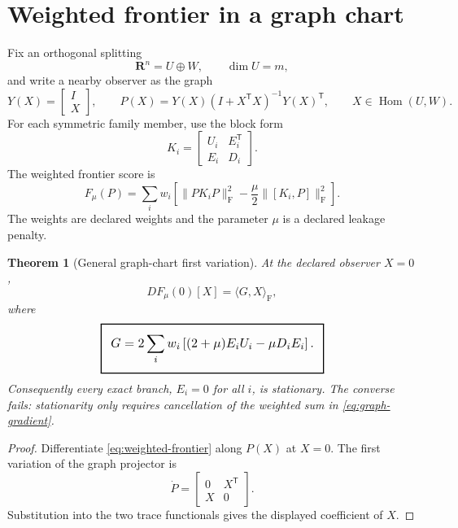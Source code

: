 \documentclass[11pt,a4paper]{article}
\numberwithin{equation}{section}
\DeclareMathOperator{\Hom}{Hom}
\newcommand{\R}{\mathbf R}
\newcommand{\Frob}{\mathrm F}
\newcommand{\geomboxed}[1]{%
  \setlength{\fboxsep}{8pt}%
  \setlength{\fboxrule}{0.9pt}%
  \fbox{\scalebox{1.12}{$\displaystyle #1$}}%
}
\theoremstyle{thmcompact}
\newtheorem{theorem}{Theorem}[section]
\theoremstyle{remark}
\begin{document}
\section{Weighted frontier in a graph chart}

Fix an orthogonal splitting
\[
\R^n=U\oplus W,\qquad \dim U=m,
\]
and write a nearby observer as the graph
\[
Y(X)=\begin{bmatrix}I\\ X\end{bmatrix},\qquad
P(X)=Y(X)(I+X^{\mathsf T}X)^{-1}Y(X)^{\mathsf T},
\qquad X\in\Hom(U,W).
\]
For each symmetric family member, use the block form
\[
K_i=
\begin{bmatrix}
U_i&E_i^{\mathsf T}\\
E_i&D_i
\end{bmatrix}.
\]
The weighted frontier score is
\begin{equation}
F_\mu(P)
=
\sum_i w_i
\left[
\|PK_iP\|_\Frob^2
-\frac{\mu}{2}\|[K_i,P]\|_\Frob^2
\right].
\label{eq:weighted-frontier}
\end{equation}
The weights are declared weights and the parameter $\mu$ is a declared leakage penalty.

\begin{theorem}[General graph-chart first variation]
\label{thm:graph-first-variation}
At the declared observer $X=0$,
\[
DF_\mu(0)[X]=\langle G,X\rangle_\Frob,
\]
where
\begin{equation}
\geomboxed{
G
=
2\sum_i w_i
\left[(2+\mu)E_iU_i-\mu D_iE_i\right].
}
\label{eq:graph-gradient}
\end{equation}
Consequently every exact branch, $E_i=0$ for all $i$, is stationary. The converse fails: stationarity only requires cancellation of the weighted sum in \eqref{eq:graph-gradient}.
\end{theorem}

\begin{proof}
Differentiate \eqref{eq:weighted-frontier} along $P(X)$ at $X=0$. The first variation of the graph projector is
\[
\dot P=
\begin{bmatrix}0&X^{\mathsf T}\\ X&0\end{bmatrix}.
\]
Substitution into the two trace functionals gives the displayed coefficient of $X$.
\end{proof}
\end{document}
